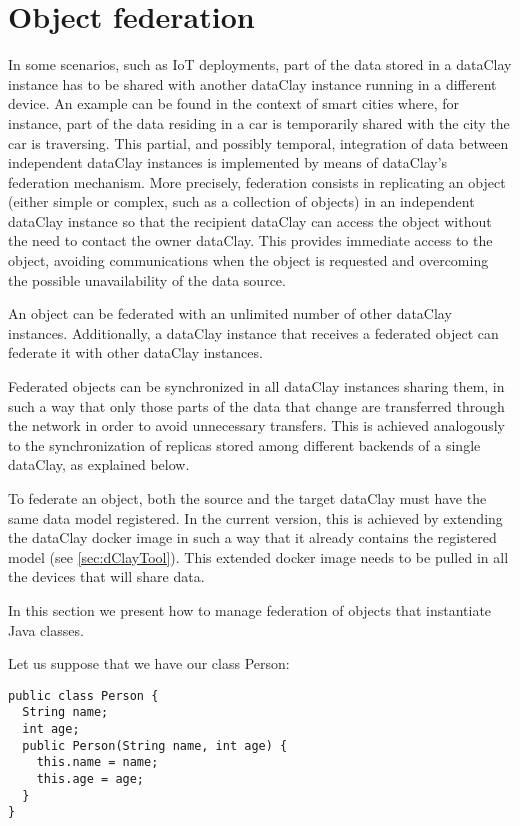 \section{Object federation}
\label{sec:jFederation}


In some scenarios, such as IoT deployments, part of the data stored in a dataClay instance has to be shared with another dataClay instance running in a different device. An example can be found in the context of smart cities where, for instance, part of the data residing in a car is temporarily shared with the city the car is traversing. This partial, and possibly temporal, integration of data between independent dataClay instances is implemented by means of dataClay's federation mechanism.
More precisely, federation consists in replicating an object (either simple or complex, such as a collection of objects) in an independent dataClay instance so that the recipient dataClay can access the object without the need to contact the owner dataClay. This provides immediate access to the object, avoiding communications when the object is requested and overcoming the possible unavailability of the data source. 

An object can be federated with an unlimited number of other dataClay instances. Additionally, a dataClay instance that receives a federated object can federate it with other dataClay instances.

Federated objects can be synchronized in all dataClay instances sharing them, in such a way that only those parts of the data that change are transferred through the network in order to avoid unnecessary transfers. This is achieved analogously to the synchronization of replicas stored among different backends of a single dataClay, as explained below. 

To federate an object, both the source and the target dataClay must have the same data model registered. In the current version, this is achieved by extending the dataClay docker image in such a way that it already contains the registered model (see \ref{sec:dClayTool}). This extended docker image needs to be pulled in all the devices that will share data.

In this section we present how to manage federation of objects that instantiate Java classes. 

Let us suppose that we have our class Person:

\begin{tBox}
\begin{lstlisting}
public class Person {
  String name;
  int age;
  public Person(String name, int age) {
    this.name = name;
    this.age = age;
  }
}
\end{lstlisting}
\end{tBox}

